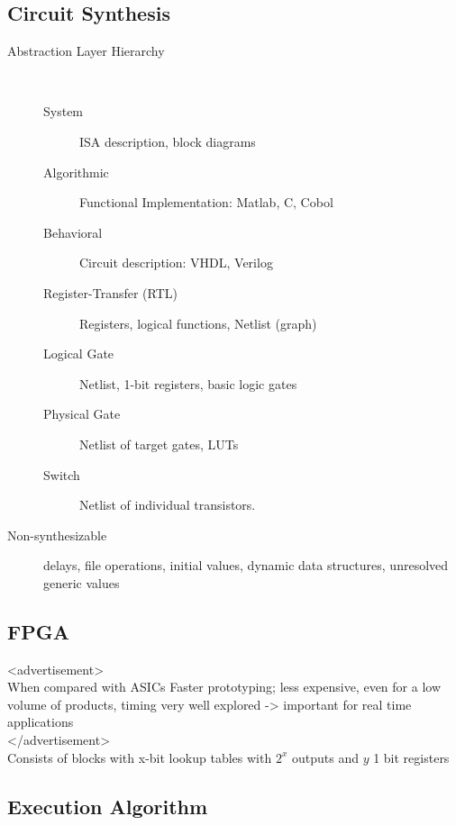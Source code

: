 \subsection{Circuit Synthesis}
\begin{description}
	\item[Abstraction Layer Hierarchy] \ 
	\begin{description}
		\item[System] ISA description, block diagrams
		\item[Algorithmic] Functional Implementation: Matlab, C, Cobol
		\item[Behavioral] Circuit description: VHDL, Verilog
		\item[Register-Transfer (RTL)] Registers, logical functions, Netlist (graph)
		\item[Logical Gate] Netlist, 1-bit registers, basic logic gates
		\item[Physical Gate] Netlist of target gates, \eg LUTs 
		\item[Switch] Netlist of individual transistors.
	\end{description}

	\item[Non-synthesizable] delays, file operations, initial values, dynamic data
	structures, unresolved generic values
\end{description}

\subsection{FPGA}
<advertisement> \\
When compared with ASICs
Faster prototyping; less expensive, even for a low volume of products, timing
very well explored -> important for real time applications \\
</advertisement>\\
Consists of blocks with x-bit lookup tables with $2^x$ outputs and $y$ 1 bit
registers

\newpage
\subsection{Execution Algorithm}
\label{sec:executionalgo}

